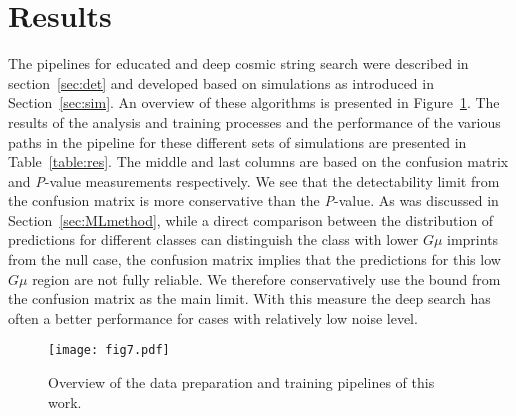 \documentclass[fleqn,usenatbib]{mnras}
\newcommand{\bt}[1]{{\textcolor{Plum}{#1}}}
\begin{document}
\section{Results}\label{sec:res}
The pipelines for educated and deep cosmic string search were described in section~\ref{sec:det} and developed based on simulations as introduced in Section~\ref{sec:sim}.
An overview of these algorithms is presented in Figure~\ref{fig:overview}.
The results of the analysis and training processes and the performance of the various paths in the pipeline for these different sets of simulations are presented in Table~\ref{table:res}. The middle and last columns  are based on the confusion matrix and  {\it P}-value measurements respectively. 
We see that the detectability limit from the confusion matrix is more conservative than the {\it P}-value. 
As was discussed in Section~\ref{sec:MLmethod}, while a direct comparison between the distribution of predictions for different classes can distinguish the class with  lower $G\mu$ imprints from the null case, the confusion matrix implies that the predictions for this low $G\mu$
region are not fully reliable. 
We therefore conservatively use the bound from the confusion matrix as the main limit.
With this measure the deep search has often a better performance for cases with relatively low noise level. %

\begin{figure}
\centering
  \texttt{[image: fig7.pdf]}
  \caption{Overview of the data preparation and training pipelines of this work.}
  \label{fig:overview}
\end{figure}
\end{document}
